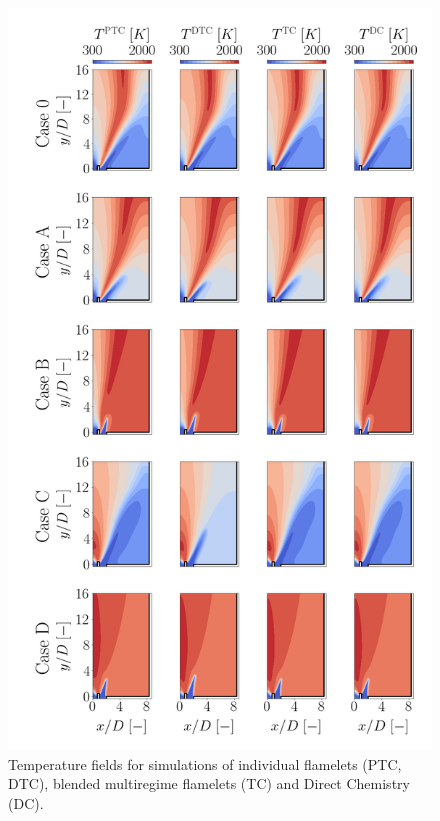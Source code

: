 \documentclass[preprint,12pt,authoryear]{elsarticle}
\begin{document}
{\begin{figure}[h!]
\centering	\includegraphics[scale=0.25]{./figures/fts_maps_comparison_T_flamelets_FR}
	\caption{Temperature fields for simulations of individual flamelets (PTC, DTC), blended multiregime flamelets (TC) and Direct Chemistry (DC).}
	\label{fig:fts_maps_comparison_T_flamelets_FR}
\end{figure}



}
\end{document}
